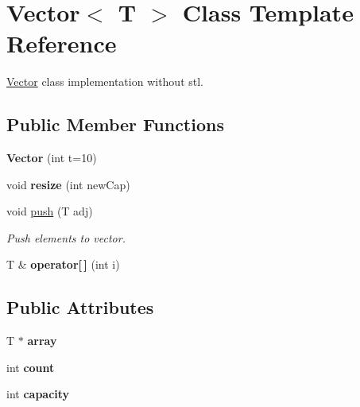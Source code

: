 \hypertarget{classVector}{}\section{Vector$<$ T $>$ Class Template Reference}
\label{classVector}


\hyperlink{classVector}{Vector} class implementation without stl.  


\subsection*{Public Member Functions}
\begin{DoxyCompactItemize}
\item 
\mbox{\label{classVector_a3acaa419a1c75e006f15277c1a2eadab}} 
{\bfseries Vector} (int t=10)
\item 
\mbox{\label{classVector_aead4cd671608c7210bfa78e748fe5960}} 
void {\bfseries resize} (int new\+Cap)
\item 
void \hyperlink{classVector_ae20302aab0ca138a87c1541a7f68214d}{push} (T adj)
\begin{DoxyCompactList}\small\item\em Push elements to vector. \end{DoxyCompactList}\item 
\mbox{\label{classVector_a5db0910fc60e17551b75f6b227c49b46}} 
T \& {\bfseries operator\mbox{[}$\,$\mbox{]}} (int i)
\end{DoxyCompactItemize}
\subsection*{Public Attributes}
\begin{DoxyCompactItemize}
\item 
\mbox{\label{classVector_ab6d96ed0a33ffcaa28ecd9b3182a656c}} 
T $\ast$ {\bfseries array}
\item 
\mbox{\label{classVector_a5d3cb041a578dd57f8100e89a798afd6}} 
int {\bfseries count}
\item 
\mbox{\label{classVector_a426ffb7c72f7b9dda5457d3bb31e6838}} 
int {\bfseries capacity}
\end{DoxyCompactItemize}


